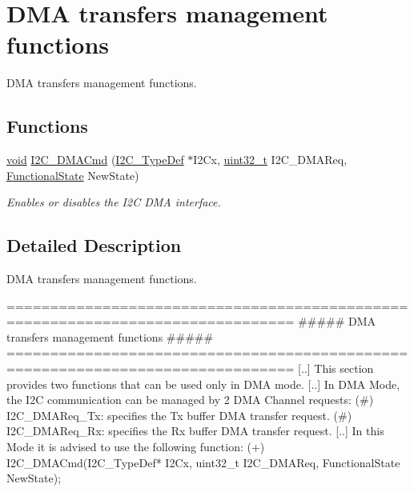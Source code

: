 \hypertarget{group___i2_c___group6}{\section{D\-M\-A transfers management functions}
\label{group___i2_c___group6}
}


D\-M\-A transfers management functions.  


\subsection*{Functions}
\begin{DoxyCompactItemize}
\item 
\hyperlink{group___n_a_m_e_ga18028b8badbf1ea7e704ccac3c488e82}{void} \hyperlink{group___i2_c___group6_gab0abbc8906c337ec1490a6c2e0033fcb}{I2\-C\-\_\-\-D\-M\-A\-Cmd} (\hyperlink{struct_i2_c___type_def}{I2\-C\-\_\-\-Type\-Def} $\ast$I2\-Cx, \hyperlink{stdint_8h_a435d1572bf3f880d55459d9805097f62}{uint32\-\_\-t} I2\-C\-\_\-\-D\-M\-A\-Req, \hyperlink{group___exported__types_gac9a7e9a35d2513ec15c3b537aaa4fba1}{Functional\-State} New\-State)
\begin{DoxyCompactList}\small\item\em Enables or disables the I2\-C D\-M\-A interface. \end{DoxyCompactList}\end{DoxyCompactItemize}


\subsection{Detailed Description}
D\-M\-A transfers management functions. \begin{DoxyVerb} ===============================================================================
               ##### DMA transfers management functions #####
 ===============================================================================  
    [..] This section provides two functions that can be used only in DMA mode.
    [..] In DMA Mode, the I2C communication can be managed by 2 DMA Channel 
         requests:
         (#) I2C_DMAReq_Tx: specifies the Tx buffer DMA transfer request.
         (#) I2C_DMAReq_Rx: specifies the Rx buffer DMA transfer request.
    [..] In this Mode it is advised to use the following function:
         (+) I2C_DMACmd(I2C_TypeDef* I2Cx, uint32_t I2C_DMAReq, FunctionalState NewState);
\end{DoxyVerb}
 

